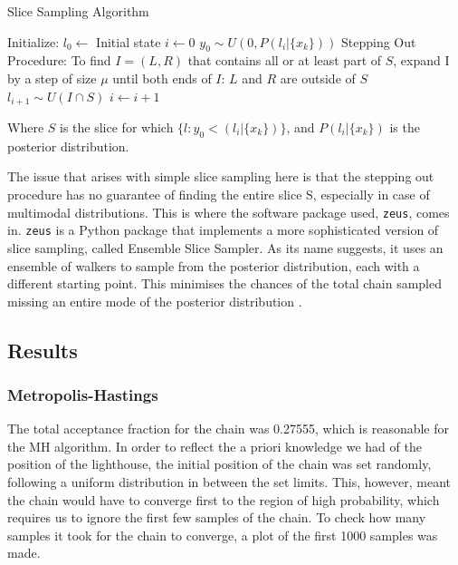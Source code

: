\documentclass[12pt]{report} %
\begin{document}
\begin{definitionbox}{Slice Sampling Algorithm \cite{karamanis_zeus}}
\fontsize{8}{12}\selectfont
    \begin{algorithmic}[1]
        \State Initialize:
        \State \quad $l_0 \gets$ Initial state
        \State \quad $i \gets 0$
         
            \State $y_{0} \sim U(0, P(l_{i}|\{x_{k}\}))$
            \State Stepping Out Procedure: To find $I = (L, R)$ that contains all or at least part of $S$, expand I by a step of size $\mu$ until both ends of $I$: $L$ and $R$ are outside of $S$
            \State $l_{i+1} \sim U(I \cap S)$ 
            \State $i \gets i + 1$
        \EndWhile
    \end{algorithmic}
    Where $S$ is the slice for which $\{l: y_{0} < (l_{i}|\{x_{k}\})\}$, and $P(l_{i}|\{x_{k}\})$ is the posterior distribution.
\end{definitionbox}

The issue that arises with simple slice sampling here is that the stepping out procedure has no guarantee of finding the entire slice S, especially in case of multimodal distributions. This is where the software package used, \texttt{zeus}, comes in. \texttt{zeus} is a Python package that implements a more sophisticated version of slice sampling, called Ensemble Slice Sampler. As its name suggests, it uses an ensemble of walkers to sample from the posterior distribution, each with a different starting point. This minimises the chances of the total chain sampled missing an entire mode of the posterior distribution \cite{karamanis_zeus}.


\subsection*{Results}

\subsubsection*{Metropolis-Hastings}


The total acceptance fraction for the chain was 0.27555, which is reasonable for the MH algorithm. In order to reflect the a priori knowledge we had of the position of the lighthouse, the initial position of the chain was set randomly, following a uniform distribution in between the set limits. This, however, meant the chain would have to converge first to the region of high probability, which requires us to ignore the first few samples of the chain. To check how many samples it took for the chain to converge, a plot of the first 1000 samples was made.
\end{document}
